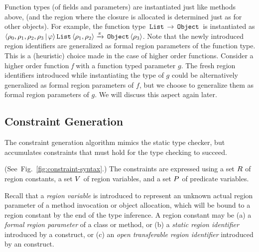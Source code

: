 Function types (of fields and parameters) are instantiated just like methods above,
(and the region where the closure is allocated is determined just as for other objects).
For example, the function type $\,{\tt List}\, \rightarrow \,{\tt Object}\,$ is instantiated as
$\langle \rho_0, \rho_1, \rho_2, \rho_3 \,|\, \varphi  \rangle \,{\tt List}\, \langle \rho_1,\rho_2 \rangle \xrightarrow{\pi} \,{\tt Object}\,\langle \rho_3 \rangle$.
Note that the newly introduced region identifiers are generalized as formal region parameters of the function type.
This is a (heuristic) choice made in the case of higher order functions.
Consider a higher order function \emph{f} with a function typed parameter $g$.
The fresh region identifiers introduced while instantiating the type of $g$ could be
alternatively generalized as formal region parameters of $f$, but we choose to
generalize them as formal region parameters of $g$.
We will discuss this aspect again later.

\subsection{Constraint Generation}
\label{sec:fb-constraintsem}

The constraint generation algorithm mimics the static type checker, but accumulates
constraints that must hold for the type checking to succeed.

(See~Fig.~\ref{fig:constraint-syntax}.)
The constraints are expressed using a set $R$ of region constants,
a set $V$ of region variables, and a set $P$ of predicate variables.



Recall that a \emph{region variable} is introduced to represent an unknown actual region parameter
of a method invocation or object allocation, which will be bound to a region constant by the end of the
type inference.
A region constant may be 
(a) a \emph{formal region parameter} of a class or method, or
(b) a \emph{static region identifier} introduced by a  construct, or
(c) an  \emph{open transferable region identifier} introduced by an  construct.

